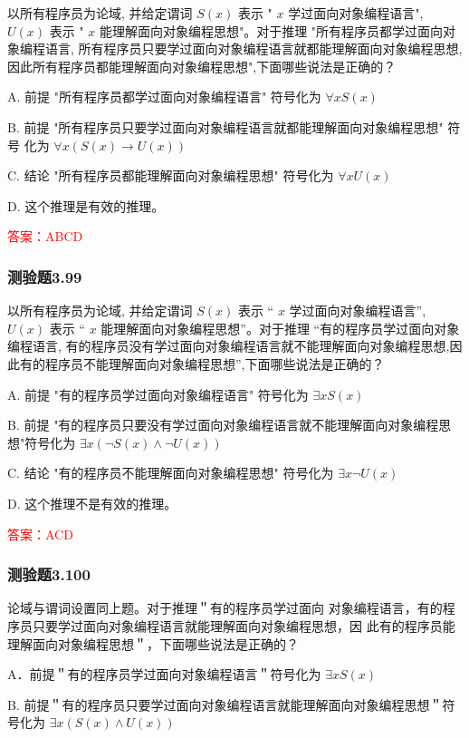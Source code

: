 \documentclass[UTF8, heading=true]{ctexart}
\begin{document}
以所有程序员为论域, 并给定谓词 $S(x)$ 表示 " $x$ 学过面向对象编程语言", $U(x)$ 表示 " $x$ 能理解面向对象编程思想"。对于推理 "所有程序员都学过面向对象编程语言, 所有程序员只要学过面向对象编程语言就都能理解面向对象编程思想,因此所有程序员都能理解面向对象编程思想",下面哪些说法是正确的？

A.  前提 "所有程序员都学过面向对象编程语言" 符号化为 $\forall x S(x)$

B.  前提 "所有程序员只要学过面向对象编程语言就都能理解面向对象编程思想" 符号
化为 $\forall x(S(x) \rightarrow U(x))$

C. 结论 "所有程序员都能理解面向对象编程思想" 符号化为 $\forall x U(x)$

D. 这个推理是有效的推理。

\textcolor{red}{答案：ABCD}

\subsubsection{测验题3.99}

以所有程序员为论域, 并给定谓词 $S(x)$ 表示 “ $x$ 学过面向对象编程语言”, $U(x)$ 表示 “ $x$ 能理解面向对象编程思想”。对于推理 “有的程序员学过面向对象编程语言, 有的程序员没有学过面向对象编程语言就不能理解面向对象编程思想,因此有的程序员不能理解面向对象编程思想”,下面哪些说法是正确的？

A. 前提 "有的程序员学过面向对象编程语言" 符号化为 $\exists x S(x)$

B.
前提 "有的程序员只要没有学过面向对象编程语言就不能理解面向对象编程思想"符号化为 $\exists x(\neg S(x) \wedge \neg U(x))$

C. 结论 "有的程序员不能理解面向对象编程思想" 符号化为 $\exists x \neg U(x)$

D. 这个推理不是有效的推理。

\textcolor{red}{答案：ACD}

\subsubsection{测验题3.100}

论域与谓词设置同上题。对于推理＂有的程序员学过面向
对象编程语言，有的程序员只要学过面向对象编程语言就能理解面向对象编程思想，因
此有的程序员能理解面向对象编程思想＂，下面哪些说法是正确的？

A．前提＂有的程序员学过面向对象编程语言＂符号化为 $\exists x S(x)$

B. 前提＂有的程序员只要学过面向对象编程语言就能理解面向对象编程思想＂符号化为 $\exists x(S(x) \wedge U(x))$
\end{document}
